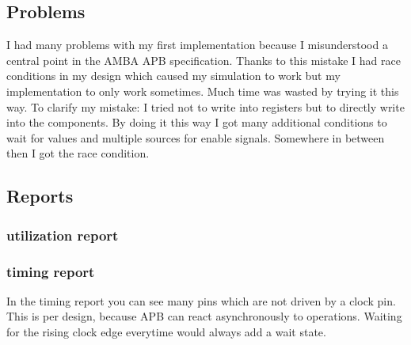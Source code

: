 


\newpage
\subsection{Problems}
I had many problems with my first implementation because I misunderstood a 
central point in the AMBA APB specification. Thanks to this mistake I had
race conditions in my design which caused my simulation to work but my 
implementation to only work sometimes. Much time was wasted by trying it
this way. To clarify my mistake: I tried not to write into registers but
to directly write into the components. By doing it this way I got many
additional conditions to wait for values and multiple sources for enable
signals. Somewhere in between then I got the race condition.

\subsection{Reports}
\subsubsection{utilization report}

\subsubsection{timing report}
In the timing report you can see many pins which are not driven by a clock pin.
This is per design, because APB can react asynchronously to operations. Waiting
for the rising clock edge everytime would always add a wait state.

